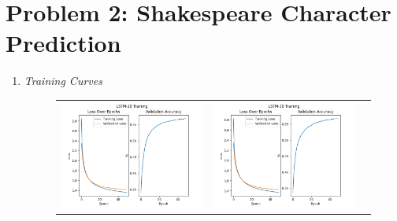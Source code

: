 \documentclass{article}
\begin{document}
\section{Problem 2: Shakespeare Character Prediction}
\begin{enumerate}[label=1\alph*. ]
    \item \textit{Training Curves}
    \begin{figure}[htb]
        \setlength\tabcolsep{0.5pt}
        \renewcommand{\arraystretch}{0}
        \begin{tabularx}{\textwidth}{XXX}
          \includegraphics{images/LSTM-20_training_new.png} &
          \includegraphics{images/LSTM-30_training_new.png} &

\end{tabularx}
\end{figure}
\end{enumerate}
\end{document}
